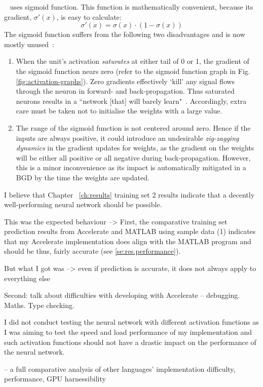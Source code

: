 ~\cite{Eve16} uses sigmoid function. This function is mathematically convenient, because its gradient, $\sigma'(x)$, is easy to calculate:
$$\sigma'(x) = \sigma(x) \cdot (1 - \sigma(x))$$
The sigmoid function suffers from the following two disadvantages and is now mostly unused~\cite{Kar16}:
\begin{enumerate}
\item When the unit's activation \textit{saturates} at either tail of 0 or 1, the gradient of the sigmoid function nears zero (refer to the sigmoid function graph in Fig. \ref{fig:activation-graphs}). Zero gradients effectively `kill' any signal flows through the neuron in forward- and back-propagation. Thus saturated neurons results in a ``network [that] will barely learn"~\cite{Kar16}. Accordingly, extra care must be taken not to initialise the weights with a large value.
\item The range of the sigmoid function is not centered around zero. Hence if the inputs are always positive, it could introduce an undesirable \textit{zig-zagging dynamics} in the gradient updates for weights, as the gradient on the weights will be either all positive or all negative during back-propagation. However, this is a minor inconvenience as its impact is automatically mitigated in a BGD by the time the weights are updated.
\end{enumerate}


I believe that Chapter ~\ref{ch:results} training set 2 results indicate that a decently well-performing neural network should be possible.


This was the expected behaviour --> First, the comparative training set prediction results from Accelerate and MATLAB using sample data (1) indicates that my Accelerate implementation does align with the MATLAB program and should be thus, fairly accurate (see \ref{se:res.performance}).

But what I got was --> even if prediction is accurate, it does not always apply to everything else

Second: talk about difficulties with developing with Accelerate -- debugging. Maths. Type checking.

I did not conduct testing the neural network with different activation functions as I was aiming to test the speed and load performance of my implementation and such activation functions should not have a drastic impact on the performance of the neural network.

-- a full comparative analysis of other languages' implementation difficulty, performance, GPU harnessibility

